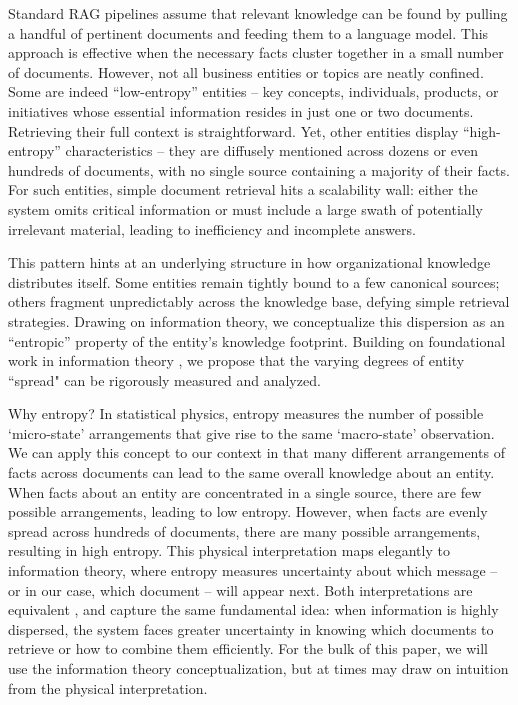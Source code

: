 \documentclass[11pt,a4paper]{article}
\begin{document}
Standard RAG pipelines assume that relevant knowledge can be found by pulling a handful of pertinent documents and feeding them to a language model. This approach is effective when the necessary facts cluster together in a small number of documents. However, not all business entities or topics are neatly confined. Some are indeed ``low-entropy'' entities -- key concepts, individuals, products, or initiatives whose essential information resides in just one or two documents. Retrieving their full context is straightforward. Yet, other entities display ``high-entropy'' characteristics -- they are diffusely mentioned across dozens or even hundreds of documents, with no single source containing a majority of their facts. For such entities, simple document retrieval hits a scalability wall: either the system omits critical information or must include a large swath of potentially irrelevant material, leading to inefficiency and incomplete answers.

This pattern hints at an underlying structure in how organizational knowledge distributes itself. Some entities remain tightly bound to a few canonical sources; others fragment unpredictably across the knowledge base, defying simple retrieval strategies. Drawing on information theory, we conceptualize this dispersion as an ``entropic'' property of the entity's knowledge footprint. Building on foundational work in information theory \cite{shannon1948mathematical,cover1991elements}, we propose that the varying degrees of entity ``spread" can be rigorously measured and analyzed.

Why entropy? In statistical physics, entropy measures the number of possible `micro-state' arrangements that give rise to the same `macro-state' observation. We can apply this concept to our context in that many different arrangements of facts across documents can lead to the same overall knowledge about an entity. When facts about an entity are concentrated in a single source, there are few possible arrangements, leading to low entropy. However, when facts are evenly spread across hundreds of documents, there are many possible arrangements, resulting in high entropy. This physical interpretation maps elegantly to information theory, where entropy measures uncertainty about which message -- or in our case, which document -- will appear next. Both interpretations are equivalent \cite{shannon1948mathematical}, and capture the same fundamental idea: when information is highly dispersed, the system faces greater uncertainty in knowing which documents to retrieve or how to combine them efficiently. For the bulk of this paper, we will use the information theory conceptualization, but at times may draw on intuition from the physical interpretation.
\end{document}
